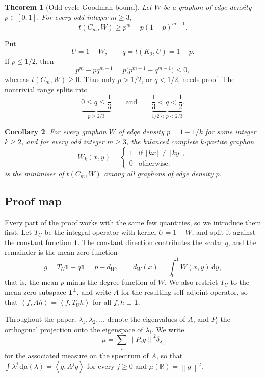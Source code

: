 \documentclass[11pt]{article}
\newtheorem{theorem}{Theorem}[section]
\newtheorem{corollary}[theorem]{Corollary}
\numberwithin{equation}{section}
\newcommand{\one}{\mathbf 1}
\newcommand{\R}{\mathbb R}
\newcommand{\ip}[2]{\left\langle #1,#2\right\rangle}
\newcommand{\norm}[1]{\left\lVert #1\right\rVert}
\newcommand{\dd}{\,\mathrm d}
\begin{document}
\begin{theorem}[Odd-cycle Goodman bound]\label{thm:main}
  Let $W$ be a graphon of edge density $p\in[0,1]$.
  For every odd integer $m\ge3$,
  \begin{equation}\label{eq:main-goal}
    t(C_m,W)\ge p^m-p(1-p)^{m-1}.
  \end{equation}
\end{theorem}

Put
\[
  U=1-W,\qquad q=t(K_2,U)=1-p.
\]
If $p\le1/2$, then
\[
  p^m-pq^{m-1}=p\bigl(p^{m-1}-q^{m-1}\bigr)\le0,
\]
whereas $t(C_m,W)\ge0$.
Thus only $p>1/2$, or $q<1/2$, needs proof.
The nontrivial range splits into
\[
  \underbrace{0\le q\le\frac{1}{3}}_{p\ge2/3}
  \qquad\text{and}\qquad
  \underbrace{\frac{1}{3}<q<\frac{1}{2}}_{1/2<p<2/3}.
\]

\begin{corollary} \label{cor:main}
  For every graphon $W$ of edge density $p = 1 - 1 / k$ for some integer $k \ge 2$, and for every odd integer $m \ge 3$, the balanced complete $k$-partite graphon
  \[
    W_k(x, y) = \begin{cases}
      1 & \text{if } \lfloor kx \rfloor \neq \lfloor ky \rfloor,
      \\
      0 & \text{otherwise}.
    \end{cases}
  \]
  is the minimiser of $t(C_m, W)$ among all graphons of edge density $p$.
\end{corollary}

\subsection{Proof map}

Every part of the proof works with the same few quantities, so we introduce them first.
Let $T_U$ be the integral operator with kernel $U=1-W$, and split it against the constant function $\one$.
The constant direction contributes the scalar $q$, and the remainder is the mean-zero function
\[
  g=T_U\one-q\one
  =p-d_W,\qquad d_W(x)=\int_0^1W(x,y)\dd y,
\]
that is, the mean $p$ minus the degree function of $W$.
We also restrict $T_U$ to the mean-zero subspace $\one^\perp$, and write $A$ for the resulting self-adjoint operator, so that $\ip f{Ah}=\ip f{T_Uh}$ for all $f,h\perp\one$.

Throughout the paper, $\lambda_1,\lambda_2,\ldots$ denote the eigenvalues of $A$, and $P_i$ the orthogonal projection onto the eigenspace of $\lambda_i$.
We write
\[
  \mu=\sum_i\norm{P_ig}^2\delta_{\lambda_i}
\]
for the associated measure on the spectrum of $A$, so that $\int\lambda^j\dd\mu(\lambda)=\ip g{A^jg}$ for every $j\ge0$ and $\mu(\R)=\norm g^2$.
\end{document}
